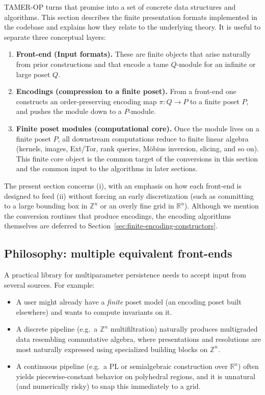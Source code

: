 \documentclass{article}
\newcommand{\<}{\langle}
\renewcommand{\>}{\rangle}
\theoremstyle{definition}
\theoremstyle{remark}
\begin{document}
	TAMER-OP turns that promise into a set of concrete data structures and algorithms.  This section describes the
	finite presentation formats implemented in the codebase and explains how they relate to the
	underlying theory.  It is useful to separate three conceptual layers:
	\begin{enumerate}[label=(\roman*)]
		\item \textbf{Front-end (Input formats).}  These are finite objects that arise naturally
		from prior constructions and that encode a tame $Q$-module for an infinite or large poset $Q$.
		\item \textbf{Encodings (compression to a finite poset).}  From a front-end one constructs an
		order-preserving encoding map $\pi\colon Q\to P$ to a finite poset $P$, and pushes the module down
		to a $P$-module. 
		\item \textbf{Finite poset modules (computational core).}  Once the module lives on a finite poset
		$P$, all downstream computations reduce to finite linear algebra (kernels, images, Ext/Tor, rank queries,
		M\"obius inversion, slicing, and so on).  This finite core object is the common target of the conversions
		in this section and the common input to the algorithms in later sections.
	\end{enumerate}
	
	The present section concerns (i), with an emphasis on how each front-end is designed to feed (ii)
	without forcing an early discretization (such as committing to a large bounding box in $\mathbb{Z}^n$
	or an overly fine grid in $\mathbb{R}^n$).  Although we mention the conversion routines that produce
	encodings, the encoding algorithms themselves are deferred to Section~\ref{sec:finite-encoding-constructors}.
	
	\subsection{Philosophy: multiple equivalent front-ends}\label{subsec:formats-philosophy}
	
	A practical library for multiparameter persistence needs to accept input from several sources.
	For example:
	\begin{itemize}
		\item A user might already have a \emph{finite} poset model (an encoding poset built elsewhere) and wants
		to compute invariants on it.
		\item A discrete pipeline (e.g.\ a $\mathbb{Z}^n$ multifiltration) naturally produces multigraded data
		resembling commutative algebra, where presentations and resolutions are most naturally expressed using
		specialized building blocks on $\mathbb{Z}^n$.
		\item A continuous pipeline (e.g.\ a PL or semialgebraic construction over $\mathbb{R}^n$) often yields
		piecewise-constant behavior on polyhedral regions, and it is unnatural (and numerically risky) to snap this
		immediately to a grid.
	\end{itemize}
	
\end{document}
